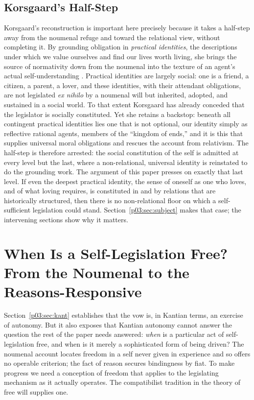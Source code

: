 \subsection{Korsgaard's Half-Step}

Korsgaard's reconstruction is important here precisely because it takes a half-step away from the noumenal refuge and toward the relational view, without completing it. By grounding obligation in \emph{practical identities}, the descriptions under which we value ourselves and find our lives worth living, she brings the source of normativity down from the noumenal into the texture of an agent's actual self-understanding \parencite{korsgaard1996sources}. Practical identities are largely social: one is a friend, a citizen, a parent, a lover, and these identities, with their attendant obligations, are not legislated \emph{ex nihilo} by a noumenal will but inherited, adopted, and sustained in a social world. To that extent Korsgaard has already conceded that the legislator is socially constituted. Yet she retains a backstop: beneath all contingent practical identities lies one that is not optional, our identity simply as reflective rational agents, members of the ``kingdom of ends,'' and it is this that supplies universal moral obligations and rescues the account from relativism. The half-step is therefore arrested: the social constitution of the self is admitted at every level but the last, where a non-relational, universal identity is reinstated to do the grounding work. The argument of this paper presses on exactly that last level. If even the deepest practical identity, the sense of oneself as one who loves, and of what loving requires, is constituted in and by relations that are historically structured, then there is no non-relational floor on which a self-sufficient legislation could stand. Section~\ref{p03:sec:subject} makes that case; the intervening sections show why it matters.

\section{When Is a Self-Legislation Free? From the Noumenal to the Reasons-Responsive}\label{p03:sec:freewill}

Section~\ref{p03:sec:kant} establishes that the vow is, in Kantian terms, an exercise of autonomy. But it also exposes that Kantian autonomy cannot answer the question the rest of the paper needs answered: \emph{when} is a particular act of self-legislation free, and when is it merely a sophisticated form of being driven? The noumenal account locates freedom in a self never given in experience and so offers no operable criterion; the fact of reason secures bindingness by fiat. To make progress we need a conception of freedom that applies to the legislating mechanism as it actually operates. The compatibilist tradition in the theory of free will supplies one.

